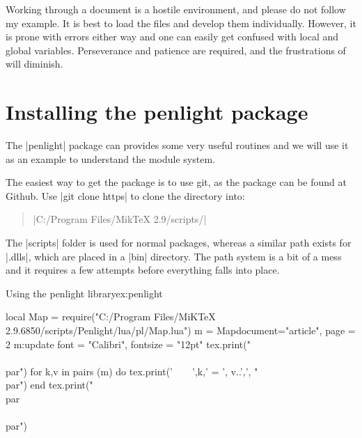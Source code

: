 %
%

Working through a document is a hostile environment, and please do not follow my example. It is best to
load the files and develop them individually. However, it is prone with errors either way and one can easily get confused with local and global variables. Perseverance and patience are required, and the frustrations of \tex will diminish.





\section{Installing the penlight package}

The |penlight| package can provides some very useful routines and we will use it as an example
to understand the module system.

The easiest way to get the package is to use git, as the package can be found at Github. Use |git clone https|  to clone the directory into: 

\begin{quote}
|C:/Program Files/MikTeX 2.9/scripts/| 
\end{quote}

The |scripts| folder is used for normal packages, whereas a similar path exists for |.dlls|, which are placed in a |bin| directory. The path system is a bit of a mess and it requires a few attempts before everything falls into place. 

\begin{texexample}{Using the penlight library}{ex:penlight}
\begin{luacode}
local Map = require("C:/Program Files/MiKTeX 2.9.6850/scripts/Penlight/lua/pl/Map.lua")
       m = Map{document="article", 
                     page = 2}
       m:update {font = "Calibri", fontsize = "12pt"}               
       tex.print("\\{\\par")
       for k,v in pairs (m)  do
           tex.print('~~~~',k,' = ', v..',', "\\par")
       end   
       tex.print("\\par\\}\\par") 
\end{luacode}
\end{texexample}


